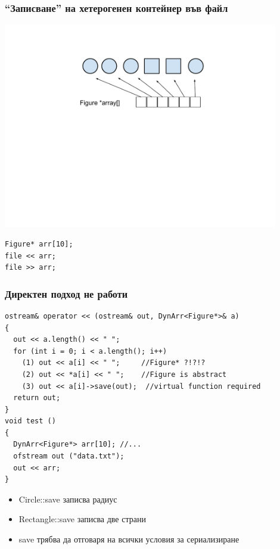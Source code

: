 \documentclass{beamer}
\begin{document}
\begin{frame}[fragile]
\frametitle{``Записване'' на хетерогенен контейнер във файл}

\vspace{-60px}
\begin{center}
\includegraphics[width=12.0cm]{images/array}
\end{center}

\vspace{-160px}
\begin{lstlisting}
Figure* arr[10];
file << arr;
file >> arr;
\end{lstlisting}

\end{frame}





\begin{frame}[fragile]
\frametitle{Директен подход не работи}

\begin{flushleft}
\begin{lstlisting}
ostream& operator << (ostream& out, DynArr<Figure*>& a)
{
  out << a.length() << " ";
  for (int i = 0; i < a.length(); i++)
    (1) out << a[i] << " ";     //Figure* ?!?!?
    (2) out << *a[i] << " ";    //Figure is abstract
    (3) out << a[i]->save(out);  //virtual function required
  return out;
}
void test ()
{
  DynArr<Figure*> arr[10]; //...
  ofstream out ("data.txt");
  out << arr;
}
\end{lstlisting}
\end{flushleft}

\begin{itemize}
  \item Circle::save записва радиус
  \item Rectangle::save записва две страни
  \item save трябва да отговаря на всички условия за сериализиране
\end{itemize}

\end{frame}
\end{document}
